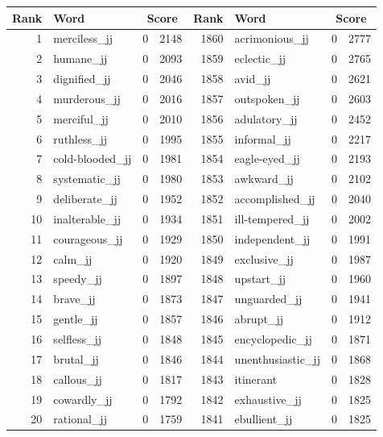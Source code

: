 \begin{table}[tbp]
    \begin{tabular}{| rlr@{.}l | rlr@{.}l |}
    \hline
    \textbf{Rank} & \textbf{Word} & \multicolumn{2}{c|}{\textbf{Score}} & \textbf{Rank} & \textbf{Word} & \multicolumn{2}{c|}{\textbf{Score}} \\
    \hline
    1 & merciless\_jj & 0 & 2148    &    1860 & acrimonious\_jj & 0 & 2777 \\
    2 & humane\_jj & 0 & 2093    &    1859 & eclectic\_jj & 0 & 2765 \\
    3 & dignified\_jj & 0 & 2046    &    1858 & avid\_jj & 0 & 2621 \\
    4 & murderous\_jj & 0 & 2016    &    1857 & outspoken\_jj & 0 & 2603 \\
    5 & merciful\_jj & 0 & 2010    &    1856 & adulatory\_jj & 0 & 2452 \\
    6 & ruthless\_jj & 0 & 1995    &    1855 & informal\_jj & 0 & 2217 \\
    7 & cold-blooded\_jj & 0 & 1981    &    1854 & eagle-eyed\_jj & 0 & 2193 \\
    8 & systematic\_jj & 0 & 1980    &    1853 & awkward\_jj & 0 & 2102 \\
    9 & deliberate\_jj & 0 & 1952    &    1852 & accomplished\_jj & 0 & 2040 \\
    10 & inalterable\_jj & 0 & 1934    &    1851 & ill-tempered\_jj & 0 & 2002 \\
    11 & courageous\_jj & 0 & 1929    &    1850 & independent\_jj & 0 & 1991 \\
    12 & calm\_jj & 0 & 1920    &    1849 & exclusive\_jj & 0 & 1987 \\
    13 & speedy\_jj & 0 & 1897    &    1848 & upstart\_jj & 0 & 1960 \\
    14 & brave\_jj & 0 & 1873    &    1847 & unguarded\_jj & 0 & 1941 \\
    15 & gentle\_jj & 0 & 1857    &    1846 & abrupt\_jj & 0 & 1912 \\
    16 & selfless\_jj & 0 & 1848    &    1845 & encyclopedic\_jj & 0 & 1871 \\
    17 & brutal\_jj & 0 & 1846    &    1844 & unenthusiastic\_jj & 0 & 1868 \\
    18 & callous\_jj & 0 & 1817    &    1843 & itinerant & 0 & 1828 \\
    19 & cowardly\_jj & 0 & 1792    &    1842 & exhaustive\_jj & 0 & 1825 \\
    20 & rational\_jj & 0 & 1759    &    1841 & ebullient\_jj & 0 & 1825 \\

\end{tabular}
\end{table}
